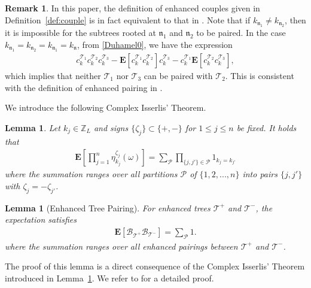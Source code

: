 \documentclass[UTF-8,reqno]{amsart}
\numberwithin{equation}{section}
\newtheorem{lemma}[theorem]{Lemma}
\theoremstyle{definition}
\newtheorem{remark}[theorem]{Remark}
\def\leq{\leqslant}
\def\leq{\leqslant}
\begin{document}
\begin{remark}
  In this paper, the definition of enhanced couples given in Definition~\ref{def:couple} is in fact equivalent to that in \cite[Definition 3.3]{DIP25}. Note that if $k_{\mathfrak{n}_1}\neq k_{\mathfrak{n}_2}$,  then it is impossible for the subtrees rooted at $\mathfrak{n}_1$ and $\mathfrak{n}_2$ to be paired.   In the case $k_{\mathfrak{n}_1}=k_{\mathfrak{n}_2}=k_{\mathfrak{n}_1}=k_{\mathfrak{n}}$, from \eqref{Duhamel0}, we have the expression
    \begin{align*}
       c^{\mathcal{T}_1}_{k}{c^{\mathcal{T}_2}_{k}}c^{\mathcal{T}_3}_{k} -\mathbf{E}[c^{\mathcal{T}_1}_{k}{c^{\mathcal{T}_2}_{k}} ]c^{\mathcal{T}_3}_{k} -c^{\mathcal{T}_1}_{k}\mathbf{E}[c^{\mathcal{T}_2}_{k}{c^{\mathcal{T}_3}_{k}} ] ,
    \end{align*}
   which implies that neither $\mathcal{T}_1$ nor $\mathcal{T}_3$ can be paired with $\mathcal{T}_2$.
This is consistent with the definition of enhanced pairing in \cite[Definition 3.3]{DIP25}.
\end{remark}

We introduce the following Complex Isserlis' Theorem.
\begin{lemma}
\label{thm:Isserlis}\cite[Lemma A.2]{DH23a}
Let  $k_j \in \mathbb{Z}_L$ and signs $\{\zeta_j\}\subset \{+,-\}$ for $1 \leq j \leq n$ be fixed. It holds that
\begin{align*}
\mathbf{E}\left[\prod_{j=1}^n \eta^{\zeta_j}_{k_j}(\omega)\right] = 
\sum_{\mathcal{P}} 
\prod_{\{j,j'\}\in\mathcal{P} } {1}_{k_j = k_{j'}}
\end{align*}
where the summation ranges over all partitions $\mathcal{P}$ of $\{1,2,...,n\}$ into pairs $\{j,j'\}$ with  $\zeta_j = -\zeta_{j'}$.

\end{lemma}

\begin{lemma}[Enhanced Tree Pairing]

For enhanced trees $\mathcal{T}^+$ and $\mathcal{T}^-$, the expectation satisfies
\begin{align*}
\mathbf{E}\left[\mathcal{B}_{\mathcal{T}^+}\mathcal{B}_{\mathcal{T}^-}\right] = 
\sum_{ \mathcal{P}}1.\label{lem:enhanced_pairing}
\end{align*}
where the summation ranges over all enhanced pairings between $\mathcal{T}^+$ and $\mathcal{T}^-$.
\end{lemma}
The proof of this lemma is a direct consequence of the Complex Isserlis' Theorem introduced in Lemma~\ref{thm:Isserlis}. We refer to \cite[Lemma 5.14]{Wu25} for a detailed proof.
\end{document}
